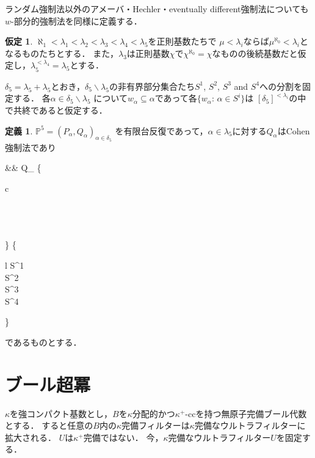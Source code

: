 \documentclass[uplatex,dvipdfmx]{jsarticle}
\newcommand{\Pa}{\mathbb{P}^5}
\renewcommand\emptyset{\varnothing}
\renewcommand{\setminus}{\smallsetminus}
\theoremstyle{definition}
\newtheorem{defi}[thm]{定義}
\newtheorem{assumption}[thm]{仮定}
\begin{document}
	ランダム強制法以外のアメーバ・Hechler・eventually different強制法についても$w$-部分的強制法を同様に定義する．
	
	\begin{assumption}\label{asm:P}
		$\aleph_1<\lambda_1<\lambda_2<\lambda_3<\lambda_4<\lambda_5$を正則基数たちで
		$\mu<\lambda_i$ならば$\mu^{\aleph_0}<\lambda_i$となるものたちとする．
		また，$\lambda_3$は正則基数$\chi$で$\chi^{\aleph_0}=\chi$なものの後続基数だと仮定し，$\lambda_5^{<\lambda_4}=\lambda_5$とする．
		
		$\delta_5=\lambda_5+\lambda_5$とおき，$\delta_5\setminus\lambda_5$の非有界部分集合たち$S^1$, $S^2$, $S^3$ and $S^4$への分割を固定する．
		各$\alpha\in \delta_5\setminus\lambda_5$ について$w_\alpha\subseteq \alpha$であって各$\{w_\alpha:\, \alpha\in S^i\}$は $[\delta_5]^{{<}\lambda_i}$の中で共終であると仮定する．
	\end{assumption}
	
	\begin{defi}\label{def:Pa}
		$\Pa=(P_\alpha,Q_\alpha)_{\alpha\in\delta_5}$ 
		を有限台反復であって，$\alpha\in \lambda_5$に対する$Q_\alpha$はCohen強制法であり
		\begin{flalign*}
			&&
			Q_\alpha\text{ は$w_\alpha$-部分的 }
			\left\{
			\begin{array}{c}
				\\
				\\
				\\
				\\
			\end{array}\right\}
			 \hspace{0.5cm} \text{($\alpha$が}
			\left\{
			\begin{array}{l}
				S^1\\
				S^2\\
				S^3\\
				S^4\\
			\end{array}
			\right\} 
			\\
		\end{flalign*}
		であるものとする．
	\end{defi}
	
	\section{ブール超冪}
	
	$\kappa$を強コンパクト基数とし，$B$を$\kappa$分配的かつ$\kappa^+$-ccを持つ無原子完備ブール代数とする．
	すると任意の$B$内の$\kappa$完備フィルターは$\kappa$完備なウルトラフィルターに拡大される．
	$U$は$\kappa^+$完備ではない．
	今，$\kappa$完備なウルトラフィルター$U$を固定する．
	
\end{document}
